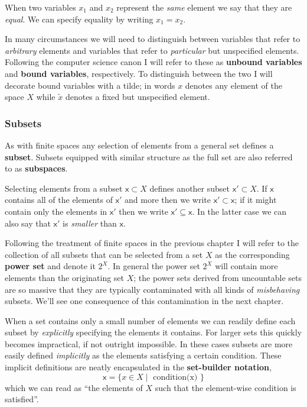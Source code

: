 \documentclass[
  letterpaper,
  DIV=11,
  numbers=noendperiod]{scrartcl}
\begin{document}
When two variables \(x_{1}\) and \(x_{2}\) represent the \emph{same}
element we say that they are \emph{equal}. We can specify equality by
writing \(x_{1} = x_{2}\).

In many circumstances we will need to distinguish between variables that
refer to \emph{arbitrary} elements and variables that refer to
\emph{particular} but unspecified elements. Following the computer
science canon I will refer to these as \textbf{unbound variables} and
\textbf{bound variables}, respectively. To distinguish between the two I
will decorate bound variables with a tilde; in words \(x\) denotes any
element of the space \(X\) while \(\tilde{x}\) denotes a fixed but
unspecified element.

\hypertarget{subsets}{%
\subsubsection{Subsets}\label{subsets}}

As with finite spaces any selection of elements from a general set
defines a \textbf{subset}. Subsets equipped with similar structure as
the full set are also referred to as \textbf{subspaces}.

Selecting elements from a subset \(\mathsf{x} \subset X\) defines
another subset \(\mathsf{x}' \subset X\). If \(\mathsf{x}\) contains all
of the elements of \(\mathsf{x}'\) and more then we write
\(\mathsf{x}' \subset \mathsf{x}\); if it might contain only the
elements in \(\mathsf{x}'\) then we write
\(\mathsf{x}' \subseteq \mathsf{x}\). In the latter case we can also say
that \(\mathsf{x}'\) is \emph{smaller} than \(\mathsf{x}\).

Following the treatment of finite spaces in the previous chapter I will
refer to the collection of all subsets that can be selected from a set
\(X\) as the corresponding \textbf{power set} and denote it \(2^X\). In
general the power set \(2^X\) will contain more elements than the
originating set \(X\); the power sets derived from uncountable sets are
so massive that they are typically contaminated with all kinds of
\emph{misbehaving} subsets. We'll see one consequence of this
contamination in the next chapter.

When a set contains only a small number of elements we can readily
define each subset by \emph{explicitly} specifying the elements it
contains. For larger sets this quickly becomes impractical, if not
outright impossible. In these cases subsets are more easily defined
\emph{implicitly} as the elements satisfying a certain condition. These
implicit definitions are neatly encapsulated in the \textbf{set-builder
notation}, \[
\mathsf{x} = \{ x \in X \mid \text{ condition(x) } \}
\] which we can read as ``the elements of \(X\) such that the
element-wise condition is satisfied''.
\end{document}
